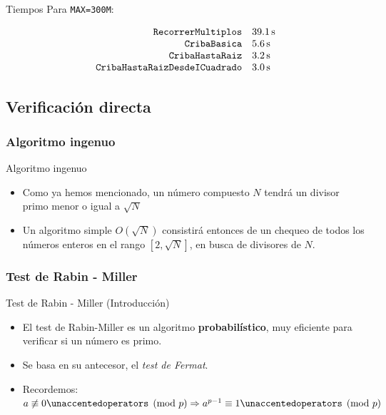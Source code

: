 \documentclass{beamer}
\begin{document}
\begin{frame}{Tiempos}
     Para \texttt{MAX=300M}:
     
     $$\begin{array}{rl}
           \mbox{\texttt{RecorrerMultiplos}} & \SI{39.1}{\second} \\
           \mbox{\texttt{CribaBasica}} & \SI{5.6}{\second} \\
           \mbox{\texttt{CribaHastaRaiz}} & \SI{3.2}{\second} \\
           \mbox{\texttt{CribaHastaRaizDesdeICuadrado}} & \SI{3.0}{\second} \\
       \end{array}$$
\end{frame}


\subsection{Verificación directa}

\subsubsection{Algoritmo ingenuo}

\begin{frame}{Algoritmo ingenuo}
  \begin{itemize}
      \item Como ya hemos mencionado, un número compuesto $N$ tendrá un divisor primo menor o igual a $\sqrt{N}$
      \item Un algoritmo simple $O(\sqrt{N})$ consistirá entonces de un chequeo de todos los números enteros en el rango $[2, \sqrt{N}]$,
             en busca de divisores de $N$.
  \end{itemize}
\end{frame}


\subsubsection{Test de Rabin - Miller}

\begin{frame}{Test de Rabin - Miller (Introducción)}
  \begin{itemize}
      \item El test de Rabin-Miller es un algoritmo \textbf{probabilístico}, muy eficiente para verificar si un número es primo.
      \item Se basa en su antecesor, el \textit{test de Fermat}.
      \item Recordemos: $a \not\equiv 0 \modulo{p} \Rightarrow a^{p-1} \equiv 1 \modulo{p}$
  \end{itemize}
\end{frame}
\end{document}
